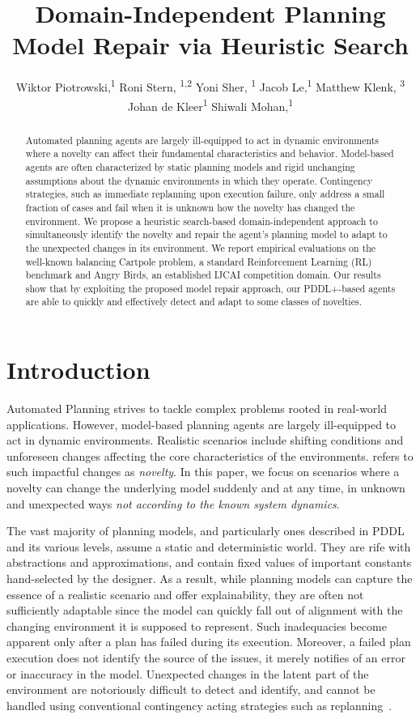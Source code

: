 \documentclass[letterpaper]{article} %
\title{Domain-Independent Planning Model Repair via Heuristic Search}
\author {
    Wiktor Piotrowski,\textsuperscript{\rm 1}
    Roni Stern, \textsuperscript{\rm 1,2}
    Yoni Sher, \textsuperscript{\rm 1}
    Jacob Le,\textsuperscript{\rm 1}
    Matthew Klenk, \textsuperscript{\rm 3}
    Johan de Kleer\textsuperscript{\rm 1}
    Shiwali Mohan,\textsuperscript{\rm 1}
}
\begin{document}
\maketitle

\begin{abstract}
Automated planning agents are largely ill-equipped to act in dynamic environments where a novelty can affect their fundamental characteristics and behavior.
Model-based agents are often characterized by static planning models and rigid unchanging assumptions about the dynamic environments in which they operate. Contingency strategies, such as immediate replanning upon execution failure, only address a small fraction of cases and fail when it is unknown how the novelty has changed the environment. We propose a heuristic search-based domain-independent approach to simultaneously identify the novelty and repair the agent's planning model to adapt to the unexpected changes in its environment. We report empirical evaluations on the well-known balancing Cartpole problem, a standard Reinforcement Learning (RL) benchmark and Angry Birds, an established IJCAI competition domain. Our results show that by exploiting the proposed model repair approach, our PDDL+-based agents are able to quickly and effectively detect and adapt to some classes of novelties.
\end{abstract}

\section{Introduction}





Automated Planning strives to tackle complex problems rooted in real-world applications. However, model-based planning agents are largely ill-equipped to act in dynamic environments. Realistic scenarios include shifting conditions and unforeseen changes affecting the core characteristics of the environments. \citet{langley2020open} refers to such impactful changes as \emph{novelty}. In this paper, we focus on scenarios where a novelty can change the underlying model suddenly and at any time, in unknown and unexpected ways \emph{not according to the known system dynamics}.

The vast majority of planning models, and particularly ones described in PDDL~\cite{mcdermott1998pddl} and its various levels, assume a static and deterministic world. They are rife with abstractions and approximations, and contain fixed values of important constants hand-selected by the designer. As a result, while planning models can capture the essence of a realistic scenario and offer explainability, they are often not sufficiently adaptable since the model can quickly fall out of alignment with the changing environment it is supposed to represent. Such inadequacies become apparent only after a plan has failed during its execution. Moreover, a failed plan execution does not identify the source of the issues, it merely notifies of an error or inaccuracy in the model. Unexpected changes in the latent part of the environment are notoriously difficult to detect and identify, and cannot be handled using conventional contingency acting strategies such as replanning~\cite{nebel1995plan}.
\end{document}
